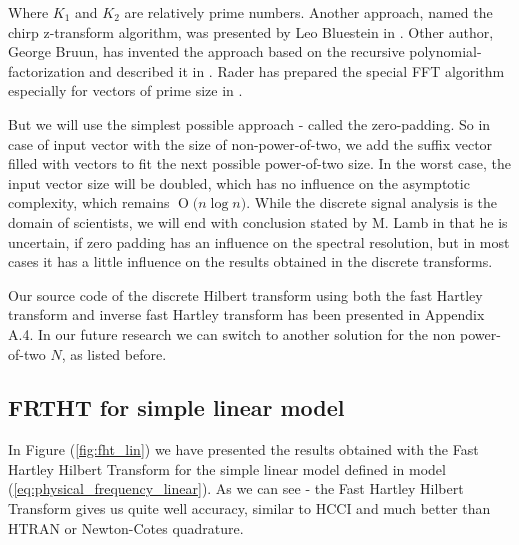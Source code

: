 \documentclass[12pt,twoside,a4paper]{article}
\numberwithin{equation}{subsection}
\numberwithin{figure}{subsection}
\newcommand{\BigO}[1]{\ensuremath{\operatorname{O}\bigl(#1\bigr)}}
\begin{document}
Where $K_1$ and $K_2$ are relatively prime numbers. Another approach, named the chirp z-transform algorithm, was presented by Leo Bluestein
in \cite{bluestein_linear}. Other author, George Bruun, has invented the approach based on the recursive polynomial-factorization and
described it in \cite{bruun_ztransform}. Rader has prepared the special FFT algorithm especially for vectors of prime size in
\cite{rader_dicrete}. 

But we will use the simplest possible approach - called the zero-padding. So in case of input vector with the size of
non-power-of-two, we add the suffix vector filled with vectors to fit the next possible power-of-two size. In the worst case, the input
vector size will be doubled, which has no influence on the asymptotic complexity, which remains $\BigO{n \log n}$. While the discrete signal
analysis is the domain of scientists, we will end with conclusion stated by M. Lamb in \cite{lamb_issues} that he is uncertain, if zero
padding has an influence on the spectral resolution, but in most cases it has a little influence on the results obtained in the discrete
transforms.

Our source code of the discrete Hilbert transform using both the fast Hartley transform and inverse fast Hartley transform has been
presented in Appendix A.4. In our future research we can switch to another solution for the non power-of-two $N$, as listed before.

\subsection{FRTHT for simple linear model} \label{chap:hartley_lin}

In Figure (\ref{fig:fht_lin}) we have presented the results obtained with the Fast Hartley Hilbert Transform for the simple linear model
defined in model (\ref{eq:physical_frequency_linear}). As we can see - the Fast Hartley Hilbert Transform gives us quite well accuracy,
similar to HCCI and much better than HTRAN or Newton-Cotes quadrature.
\end{document}
